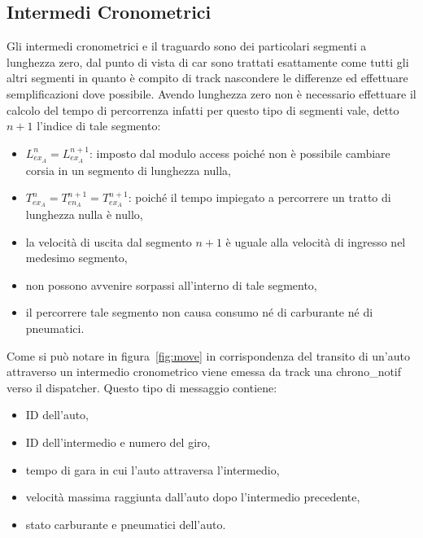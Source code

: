 \documentclass[11pt,a4paper]{report}
\begin{document}
\subsection{Intermedi Cronometrici}
Gli intermedi cronometrici e il traguardo sono dei particolari segmenti a lunghezza zero, dal punto di vista di car sono trattati esattamente come tutti gli altri segmenti in quanto è compito di track nascondere le differenze ed effettuare semplificazioni dove possibile. Avendo lunghezza zero non è necessario effettuare il calcolo del tempo di percorrenza infatti per questo tipo di segmenti vale, detto $n+1$ l'indice di tale segmento:
\begin{itemize}
\item $L_{ex_A}^{n} = L_{ex_A}^{n+1}$: imposto dal modulo access poiché non è possibile cambiare corsia in un segmento di lunghezza nulla,
\item $T_{ex_A}^{n} = T_{en_A}^{n+1} = T_{ex_A}^{n+1}$: poiché il tempo impiegato a percorrere un tratto di lunghezza nulla è nullo,
\item la velocità di uscita dal segmento $n+1$ è uguale alla velocità di ingresso nel medesimo segmento,
\item non possono avvenire sorpassi all'interno di tale segmento,
\item il percorrere tale segmento non causa consumo né di carburante né di pneumatici.
\end{itemize}
Come si può notare in figura~\ref{fig:move} in corrispondenza del transito di un'auto attraverso un intermedio cronometrico viene emessa da track una chrono\_notif verso il dispatcher. Questo tipo di messaggio contiene:
\begin{itemize}
\item ID dell'auto,
\item ID dell'intermedio e numero del giro,
\item tempo di gara in cui l'auto attraversa l'intermedio,
\item velocità massima raggiunta dall'auto dopo l'intermedio precedente,
\item stato carburante e pneumatici dell'auto.
\end{itemize}
\end{document}
